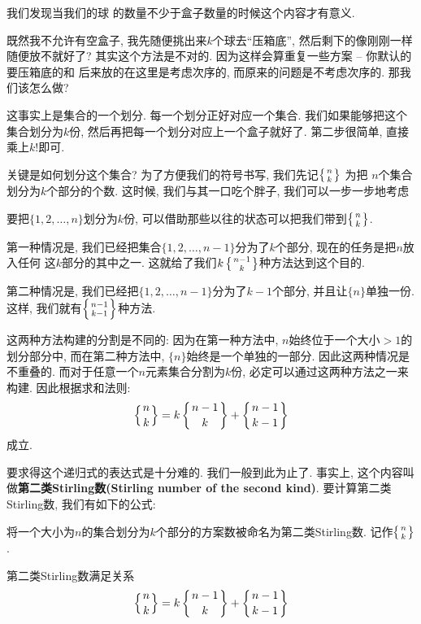  我们发现当我们的球
的数量不少于盒子数量的时候这个内容才有意义. 

既然我不允许有空盒子, 我先随便挑出来$k$个球去``压箱底'', 然后剩下的像刚刚一样
随便放不就好了? 其实这个方法是不对的. 因为这样会算重复一些方案 -- 你默认的要压箱底的和
后来放的在这里是考虑次序的, 而原来的问题是不考虑次序的. 那我们该怎么做? 

这事实上是集合的一个划分. 每一个划分正好对应一个集合. 我们如果能够把这个集合划分为$k$份, 
然后再把每一个划分对应上一个盒子就好了. 第二步很简单, 直接乘上$k!$即可. 

关键是如何划分这个集合? 为了方便我们的符号书写, 我们先记$\left\{{n \atop k}\right\}$ 为把
$n$个集合划分为$k$个部分的个数. 这时候, 我们与其一口吃个胖子, 我们可以一步一步地考虑

要把$\{1,2,\ldots,n\}$划分为$k$份, 可以借助那些以往的状态可以把我们带到$\left\{{n \atop k}\right\}$. 

第一种情况是, 我们已经把集合$\{1,2,\ldots,{n-1}\}$分为了$k$个部分, 现在的任务是把$n$放入任何
这$k$部分的其中之一. 这就给了我们$k\left\{{n-1 \atop k}\right\}$种方法达到这个目的. 

第二种情况是, 我们已经把$\{1,2,\ldots,{n-1}\}$分为了$k-1$个部分, 并且让$\{n\}$单独一份. 
这样, 我们就有$\left\{{n-1 \atop k-1}\right\}$种方法. 

这两种方法构建的分割是不同的: 因为在第一种方法中, $n$始终位于一个大小$>1$的划分部分中, 
而在第二种方法中, $\{n\}$始终是一个单独的一部分. 因此这两种情况是不重叠的. 
而对于任意一个$n$元素集合分割为$k$份, 必定可以通过这两种方法之一来构建. 因此根据求和法则: 
$$
\left\{{n \atop k}\right\}=k\left\{{n-1 \atop k}\right\}+\left\{{n-1 \atop k-1}\right\}
$$
成立. 

要求得这个递归式的表达式是十分难的. 我们一般到此为止了. 事实上, 这个内容叫做{\textbf{第二类Stirling数(Stirling number of the second kind)}}. 
要计算第二类Stirling数, 我们有如下的公式: 

\begin{definition}[第二类Stirling数]
  将一个大小为$n$的集合划分为$k$个部分的方案数被命名为第二类Stirling数. 记作$\left\{{n \atop k}\right\}$. 
\end{definition}

\begin{theorem}
  第二类Stirling数满足关系
  $$
  \left\{{n \atop k}\right\}=k\left\{{n-1 \atop k}\right\}+\left\{{n-1 \atop k-1}\right\}
  $$
\end{theorem}

